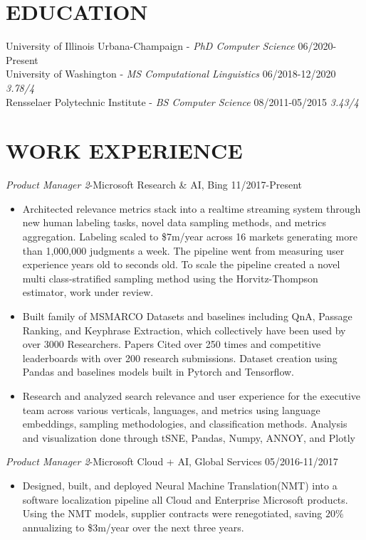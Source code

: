 \documentclass[line,margin]{res}
\begin{document}
\address{Urbana, Il (415)-272-9964 \href{mailto:dfcf93@hotmail.com}{dfcf93@hotmail.com}}
\begin{resume}
\section{EDUCATION}
University of Illinois Urbana-Champaign - {\sl PhD Computer Science} 06/2020-Present \\
University of Washington - {\sl MS Computational Linguistics} 06/2018-12/2020 {\sl 3.78/4} \\
Rensselaer Polytechnic Institute - {\sl BS Computer Science} 08/2011-05/2015  {\sl 3.43/4} \\      
\section{WORK EXPERIENCE} 
{\sl Product Manager 2}-Microsoft Research \& AI,  Bing  \hfill 11/2017-Present
\begin{itemize}  \itemsep -4pt 
\item Architected relevance metrics stack into a realtime streaming system through new human labeling tasks, novel data sampling methods, and metrics aggregation. Labeling scaled to \$7m/year across 16 markets generating more than 1,000,000 judgments a week. The pipeline went from measuring user experience years old to seconds old. To scale the pipeline created a novel multi class-stratified sampling method using the Horvitz-Thompson estimator, work under review.
\item  Built family of MSMARCO Datasets and baselines including QnA, Passage Ranking, and Keyphrase Extraction, which collectively have been used by over 3000 Researchers. Papers Cited over 250 times and competitive leaderboards with over 200 research submissions. Dataset creation using Pandas and baselines models built in Pytorch and Tensorflow.
\item Research and analyzed search relevance and user experience for the executive team across various verticals, languages, and metrics using language embeddings, sampling methodologies, and classification methods. Analysis and visualization done through tSNE, Pandas, Numpy, ANNOY, and Plotly
\end{itemize}
{\sl Product Manager 2}-Microsoft Cloud + AI, Global Services \hfill 05/2016-11/2017
\begin{itemize}  \itemsep -4pt
\item Designed, built, and deployed Neural Machine Translation(NMT) into a software localization pipeline all Cloud and Enterprise Microsoft products. Using the NMT models, supplier contracts were renegotiated, saving $20\%$ annualizing to \$3m/year over the next three years.

\end{itemize}
\end{resume}
\end{document}
